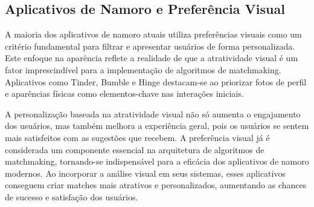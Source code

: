 \subsection{Aplicativos de Namoro e Preferência Visual}

A maioria dos aplicativos de namoro atuais utiliza preferências visuais como um critério fundamental para filtrar e apresentar usuários de forma personalizada. Este enfoque na aparência reflete a realidade de que a atratividade visual é um fator imprescindível para a implementação de algoritmos de matchmaking. Aplicativos como Tinder, Bumble e Hinge destacam-se ao priorizar fotos de perfil e aparências físicas como elementos-chave nas interações iniciais.

A personalização baseada na atratividade visual não só aumenta o engajamento dos usuários, mas também melhora a experiência geral, pois os usuários se sentem mais satisfeitos com as sugestões que recebem. A preferência visual já é considerada um componente essencial na arquitetura de algoritmos de matchmaking, tornando-se indispensável para a eficácia dos aplicativos de namoro modernos. Ao incorporar a análise visual em seus sistemas, esses aplicativos conseguem criar matches mais atrativos e personalizados, aumentando as chances de sucesso e satisfação dos usuários.